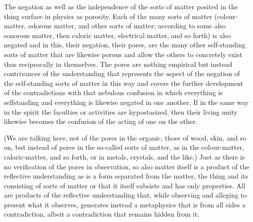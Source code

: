    The negation as well as the independence of the sorts of matter
    posited in the thing surface in physics as porosity.
    Each of the many sorts of matter
    (colour-matter, odorous matter, and other sorts of matter;
    according to some also sonorous matter, then caloric matter,
    electrical matter, and so forth)
    is also negated and in this, their negation,
    their pores, are the many other self-standing sorts of
    matter that are likewise porous and allow the others to concretely
    exist thus reciprocally in themselves.
    The pores are nothing empirical but instead contrivances of
    the understanding that represents the
    aspect of the negation of the self-standing sorts of matter in this
    way and covers the further development of the contradictions with
    that nebulous confusion in which everything is selfstanding and
    everything is likewise negated in one another.
    If in the same way in the spirit
    the faculties or activities are hypostasized,
    then their living unity likewise becomes
    the confusion of the acting of one on the other.

    (We are talking here, not of the pores in the organic,
    those of wood, skin, and so on, but instead of pores
    in the so-called sorts of matter, as in the colour-matter,
    caloric-matter, and so forth, or in metals, crystals, and the like.)
    Just as there is no verification of the pores in observation,
    so also matter itself is a product of the reflective understanding as
    is a form separated from the matter, the thing and its consisting of
    sorts of matter or that it itself subsists and has only properties.
    All are products of the reflective understanding that,
    while observing and alleging to present what it observes,
    generates instead a metaphysics that is from all sides a contradiction,
    albeit a contradiction that remains hidden from it.
